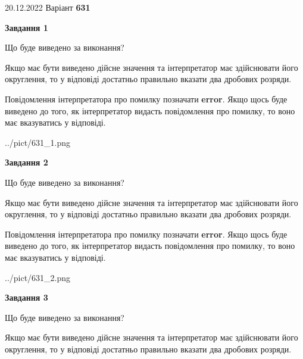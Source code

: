 \documentclass[12pt, ukrainian]{article}
\begin{document}
{20.12.2022 Варіант \No \textbf { 631 }\par}
{
\begin {Large}

{\begin {center}\textbf{Завдання 1}\end {center}}\par
Що буде виведено за виконання? \par

Якщо має бути виведено дійсне значення та інтерпретатор має здійснювати його округлення, 
то у відповіді достатньо правильно вказати два дробових розряди.

Повідомлення інтерпретатора про помилку позначати \textbf{error}.
Якщо щось буде виведено до того, як інтерпретатор видасть повідомлення про помилку, 
то воно має вказуватись у відповіді. \par

\begin{center}
	{../pict/631_1.png}
\end{center}
\newpage

{\begin {center}\textbf{Завдання 2}\end {center}}\par
Що буде виведено за виконання? \par

Якщо має бути виведено дійсне значення та інтерпретатор має здійснювати його округлення, 
то у відповіді достатньо правильно вказати два дробових розряди.

Повідомлення інтерпретатора про помилку позначати \textbf{error}.
Якщо щось буде виведено до того, як інтерпретатор видасть повідомлення про помилку, 
то воно має вказуватись у відповіді. \par

\begin{center}
	{../pict/631_2.png}
\end{center}
\newpage

{\begin {center}\textbf{Завдання 3}\end {center}}\par
Що буде виведено за виконання? \par

Якщо має бути виведено дійсне значення та інтерпретатор має здійснювати його округлення, 
то у відповіді достатньо правильно вказати два дробових розряди.


\end{Large}}
\end{document}
